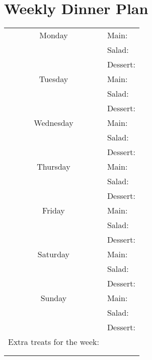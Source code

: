 \documentclass[12pt]{article}
\begin{document}
\section*{Weekly Dinner Plan}

\begin{tabular}{|c|l|}
  \hline
  Monday 	& Main: \hspace*{45mm}\\
					& Salad: \\
					& Dessert: \\ \cline{2-2}
  \hline
	Tuesday 	& Main: \hspace*{45mm}\\
					& Salad: \\
					& Dessert: \\ \cline{2-2}
  \hline
	 Wednesday 	& Main: \hspace*{45mm}\\
					& Salad: \\
					& Dessert: \\ \cline{2-2}
  \hline
	 Thursday 	& Main: \hspace*{45mm}\\
					& Salad: \\
					& Dessert: \\ \cline{2-2}
  \hline
	 Friday 	& Main: \hspace*{45mm}\\
					& Salad: \\
					& Dessert: \\ \cline{2-2}
  \hline
	 Saturday 	& Main: \hspace*{45mm}\\
					& Salad: \\
					& Dessert: \\ \cline{2-2}
  \hline
	 Sunday 	& Main: \hspace*{45mm}\\
					& Salad: \\
					& Dessert: \\ \cline{2-2}
  \hline \hline
  Extra treats for the week: & \\
														& \\
														& \\
  \hline
\end{tabular}
\end{document}
